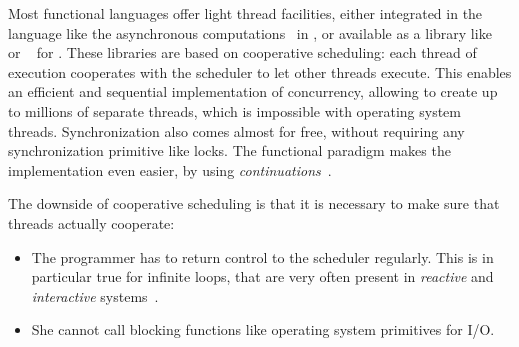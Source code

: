 \documentclass[9pt,preprint]{sigplanconf}
\begin{document}

Most functional languages offer light thread facilities, either integrated in the language like the asynchronous computations~\cite{Syme:2011} in \fsharp, or available as a library like \conhaskell~\cite{Jones:1996} or \lwt~\cite{Vouillon:2008} for \ocaml. These libraries are based on cooperative scheduling: each thread of execution cooperates with the scheduler to let other threads execute. This enables an efficient and sequential implementation of concurrency, allowing to create up to millions of separate threads, which is impossible with operating system threads. Synchronization also comes almost for free, without requiring any synchronization primitive like locks. The functional paradigm makes the implementation even easier, by using \emph{continuations}~\cite{Claessen:1999}.

The downside of cooperative scheduling is that it is necessary to make sure that threads actually cooperate:
\begin{itemize}
\item The programmer has to return control to the scheduler regularly. This is in particular true for infinite loops, that are very often present in \emph{reactive} and \emph{interactive} systems~\cite{Harel:1985}. 
\item She cannot call blocking functions like operating system primitives for I/O. 
\end{itemize}
\end{document}
